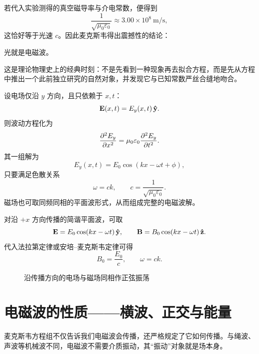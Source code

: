 若代入实验测得的真空磁导率与介电常数，便得到
\[
\frac{1}{\sqrt{\mu_0\varepsilon_0}}\approx 3.00\times 10^8\ \text{m/s},
\]
这恰好等于光速 $c$。因此麦克斯韦得出震撼性的结论：
\begin{center}
\Large 光就是电磁波。
\end{center}

这是理论物理史上的经典时刻：不是先看到一种现象再去拟合方程，而是先从方程中推出一个此前独立研究的自然对象，并发现它与已知常数严丝合缝地吻合。

\begin{example}[一维平面电磁波满足波动方程]
设电场仅沿 $y$ 方向，且只依赖于 $x,t$：
\[
\vb{E}(x,t)=E_y(x,t)\,\vu{y}.
\]
则波动方程化为
\[
\pdv[2]{E_y}{x}=\mu_0\varepsilon_0\pdv[2]{E_y}{t}.
\]
其一组解为
\[
E_y(x,t)=E_0\cos(kx-\omega t+\phi),
\]
只要满足色散关系
\[
\omega=ck,\qquad c=\frac{1}{\sqrt{\mu_0\varepsilon_0}}.
\]
磁场也可取同频同相的平面波形式，从而组成完整的电磁波解。
\end{example}

\begin{law}[平面电磁波的场关系]
对沿 $+x$ 方向传播的简谐平面波，可取
\[
\vb{E}=E_0\cos(kx-\omega t)\,\vu{y},
\qquad
\vb{B}=B_0\cos(kx-\omega t)\,\vu{z}.
\]
代入法拉第定律或安培--麦克斯韦定律可得
\[
B_0=\frac{E_0}{c},
\qquad
\omega=ck.
\]
\end{law}

\begin{figure}[htbp]
\centering
{}
\caption{沿传播方向的电场与磁场同相作正弦振荡}
\end{figure}

\section{电磁波的性质——横波、正交与能量}

麦克斯韦方程组不仅告诉我们电磁波会传播，还严格规定了它如何传播。与绳波、声波等机械波不同，电磁波不需要介质振动，其“振动”对象就是场本身。

